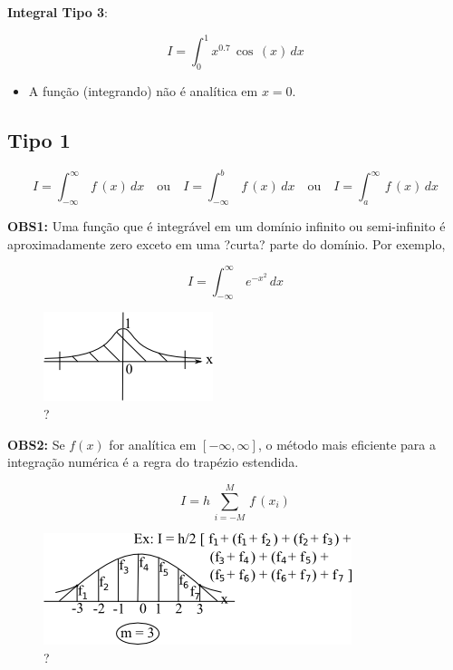 \begin{enumerate}
\begin{description}
\item
\textbf{Integral Tipo 3}:

\begin{equation}
 \label{cap2:sec8:eq3}
 I = \int_0^1 x^{0.7} \, \cos\,(x) \, dx
\end{equation}

\begin{itemize}
\item 
A função (integrando) não é analítica em $x = 0$.
\end{itemize}

\end{description}

\end{enumerate}

\subsection{Tipo 1}

\[
 I = \int_{-\infty}^\infty \, f\,(x) \, dx
 \quad \mbox{ou} \quad
 I = \int_{-\infty}^b \, f\,(x) \, dx
 \quad \mbox{ou} \quad
 I = \int_a^\infty \, f\,(x) \, dx
\]

\textbf{OBS1:} Uma função que é integrável em um domínio infinito ou semi-infinito é aproximadamente zero exceto em uma ?curta? parte do domínio. Por exemplo,

\[
 I = \int_{-\infty}^\infty \, e^{-x^2} \, dx
\]

\begin{figure}[htb]
 \centering
 \includegraphics[scale=1.0]{capitulos/capitulo2/figuras/int_func_lim_inf1.png}
 \caption{?}
 \label{fig:int_func_lim_inf1}
\end{figure}

\textbf{OBS2:} Se $f(x)$ for analítica em $[-\infty,\infty]$, o método mais eficiente para a integração numérica é a regra do trapézio estendida.

\[
 I = h \, \sum_{i=-M}^M \, f\,(x_i)
\]

\begin{figure}[htp]
 \centering
 \includegraphics[scale=1.0]{capitulos/capitulo2/figuras/int_func_lim_inf2.png}
 \caption{?}
 \label{fig:int_func_lim_inf2}
\end{figure}

